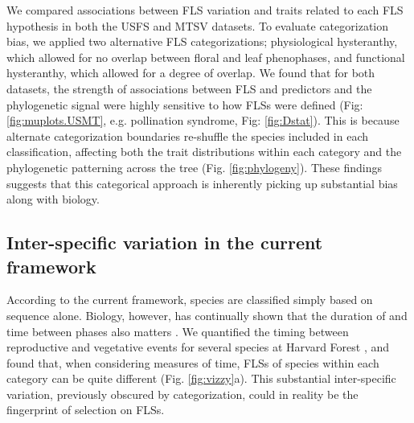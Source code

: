 \documentclass{article}
\begin{document}
\noindent We compared associations between FLS variation and traits related to each FLS hypothesis in both the USFS and MTSV datasets. To evaluate categorization bias, we applied two alternative FLS categorizations; physiological hysteranthy, which allowed for no overlap between floral and leaf phenophases, and functional hysteranthy, which allowed for a degree of overlap. We found that for both datasets, the strength of associations between FLS and predictors and the phylogenetic signal were highly sensitive to how FLSs were defined (Fig: \ref{fig:muplots.USMT}, e.g. pollination syndrome, Fig: \ref{fig:Dstat}). This is because alternate categorization boundaries re-shuffle the species included in each classification, affecting both the trait distributions within each category and the phylogenetic patterning across the tree (Fig. \ref{fig:phylogeny}). These findings suggests that this categorical approach is inherently picking up substantial bias along with biology. %

\subsection*{Inter-specific variation in the current framework}
\noindent According to the current framework, species are classified simply based on sequence alone. Biology, however, has continually shown that the duration of and time between phases also matters \citep{Inouye2019}. We quantified the timing between reproductive and vegetative events for several species at Harvard Forest \citep{OKeefe2015}, and found that, when considering measures of time, FLSs of species within each category can be quite different (Fig. \ref{fig:vizzy}a). This substantial inter-specific variation, previously obscured by categorization, could in reality be the fingerprint of selection on FLSs.\\ %
\end{document}
